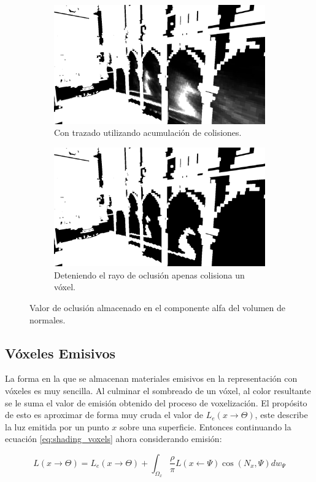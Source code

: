 \begin{figure}[H]
	\centering
	\begin{subfigure}[t]{0.49\textwidth}
		\centering
		\captionsetup{justification=centering}
		\includegraphics[width=\linewidth]{media/soft_traced.png}
		\caption*{Con trazado utilizando acumulación de colisiones.}
	\end{subfigure}%
	\hspace{0.01\textwidth}
	\begin{subfigure}[t]{0.49\textwidth}
		\centering
		\captionsetup{justification=centering}
		\includegraphics[width=\linewidth]{media/hard_traced.png}
		\caption*{Deteniendo el rayo de oclusión apenas colisiona un vóxel.}
	\end{subfigure}%
	\caption{Valor de oclusión almacenado en el componente alfa del volumen de normales.}
	\label{fig:vshadows_hit}
\end{figure}

\subsection{Vóxeles Emisivos}
La forma en la que se almacenan materiales emisivos en la representación con vóxeles es muy sencilla. Al culminar el sombreado de un vóxel, al color resultante se le suma el valor de emisión obtenido del proceso de voxelización. El propósito de esto es aproximar de forma muy cruda el valor de $L_e(x\to\Theta)$, este describe la luz emitida por un punto $x$ sobre una superficie. Entonces continuando la ecuación \ref{eq:shading_voxels} ahora considerando emisión:

\begin{equation}
		L(x\to\Theta) = L_e(x\to\Theta) + \int_{\Omega_{x}}{\frac{\rho}{\pi}L(x\gets\Psi)\cos(N_{x}, \Psi)dw_{\Psi}}
\end{equation}

